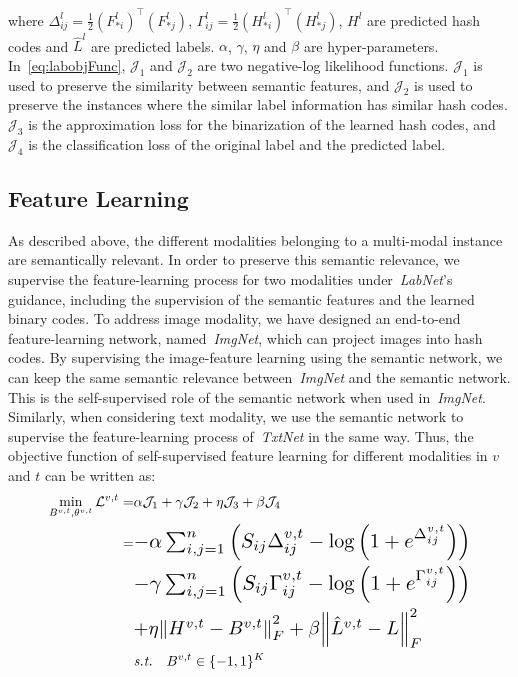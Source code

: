 \documentclass[10pt,twocolumn,letterpaper]{article}
\begin{document}
where ${\Delta}_{ij}^{l}=\frac{1}{2}({F_{\ast i}^{l} })^{\top}({F}_{\ast j}^{l})$, ${\Gamma }_{ij}^{l}=\frac{1}{2}({H_{\ast i}^{l}})^{\top}({ H_{\ast j}^{l} })$, $H^{l}$ are predicted hash codes and $\hat{L}^{l}$ are predicted labels. $\alpha$, $\gamma$, $\eta$ and $\beta$ are hyper-parameters. In~\eqref{eq:labobjFunc}, $\mathcal{J}_{1}$ and $\mathcal{J}_{2}$ are two negative-log likelihood functions. $\mathcal{J}_{1}$ is used to preserve the similarity between semantic features, and $\mathcal{J}_{2}$ is used to preserve the instances where the similar label information has similar hash codes. $\mathcal{J}_{3}$ is the approximation loss for the binarization of the learned hash codes, and $\mathcal{J}_{4}$ is the classification loss of the original label and the predicted label.
\vspace{-0.4cm}
\subsection{Feature Learning}
\vspace{-0.2cm}
As described above, the different modalities belonging to a multi-modal instance are semantically relevant. In order to preserve this semantic relevance, we supervise the feature-learning process for two modalities under~\emph{LabNet}'s guidance, including  the supervision of the semantic features and the learned binary codes. To address image modality, we have designed an end-to-end feature-learning network, named~\emph{ImgNet}, which can project images into hash codes. By supervising the image-feature learning using the semantic network, we can keep the same semantic relevance between~\emph{ImgNet} and the semantic network. This is the self-supervised role of the semantic network when used in~\emph{ImgNet}. Similarly, when considering text modality, we use the semantic network to supervise the feature-learning process of~\emph{TxtNet} in the same way. Thus, the objective function of self-supervised feature learning for different modalities in $v$ and $t$ can be written as:
\vspace{-0.1cm}
\begin{equation} \label{eq:imgobjFunc}
\begin{aligned}
\min\limits_{B^{v,t},\theta^{v,t}}\mathcal{L}^{v,t} =&\alpha \mathcal{J}_{1} + \gamma \mathcal{J}_{2} + \eta \mathcal{J}_{3} + \beta \mathcal{J}_{4} \\
=&\resizebox{0.7\hsize}{!}{$-\alpha \sum _{ i,j=1 }^{ n }{ \left( { S }_{ ij } { \Delta  }_{ ij }^{ v,t  }-\log { \left( 1+{ e }^{ { \Delta  }_{ ij }^{v,t} } \right)} \right)  } $}\\
&\resizebox{0.7\hsize}{!}{$-\gamma \sum _{ i,j=1 }^{ n }{ \left( { S }_{ ij }{ \Gamma  }_{ ij }^{v,t}-\log { \left( 1 +{ e }^{ { \Gamma  }_{ ij }^{v,t} } \right)  }  \right)  } $}\\
&\resizebox{0.6\hsize}{!}{$+\eta { \left\| {H^{v,t}}-{B}^{v,t} \right\| }_{ F }^{2}
+\beta { \left\| { \hat{ L } }^{v,t}- L \right\|  }_{ F }^{2} $}\\
&\emph{s.t.} \quad {B}^{v,t}\in \{-1, 1\}^K
\end{aligned}
\end{equation}
\end{document}
